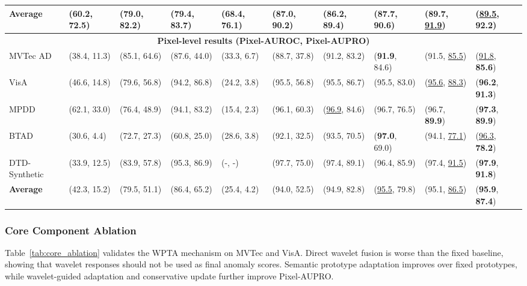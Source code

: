 \documentclass[runningheads]{llncs}
\begin{document}
\begin{table}[htbp]
{\begin{tabular}{llllllllll}
      \midrule
      \textbf{Average} & (60.2, 72.5) & (79.0, 82.2) & (79.4, 83.7) & (68.4, 76.1) & (87.0, 90.2) & (86.2, 89.4) & (87.7, 90.6) & (\textbf{89.7}, \underline{91.9}) & (\underline{89.5}, \textbf{92.2}) \\
      \midrule
      \multicolumn{10}{c}{\textbf{Pixel-level results (Pixel-AUROC, Pixel-AUPRO)}} \\
      \midrule
      MVTec AD & (38.4, 11.3) & (85.1, 64.6) & (87.6, 44.0) & (33.3, 6.7) & (88.7, 37.8) & (91.2, 83.2) & (\textbf{91.9}, 84.6) & (91.5, \underline{85.5}) & (\underline{91.8}, \textbf{85.6}) \\
      VisA & (46.6, 14.8) & (79.6, 56.8) & (94.2, 86.8) & (24.2, 3.8) & (95.5, 56.8) & (95.5, 86.7) & (95.5, 83.0) & (\underline{95.6}, \underline{88.3}) & (\textbf{96.2}, \textbf{91.3}) \\
      MPDD & (62.1, 33.0) & (76.4, 48.9) & (94.1, 83.2) & (15.4, 2.3) & (96.1, 60.3) & (\underline{96.9}, 84.6) & (96.7, 76.5) & (96.7, \textbf{89.9}) & (\textbf{97.3}, \textbf{89.9}) \\
      BTAD & (30.6, 4.4) & (72.7, 27.3) & (60.8, 25.0) & (28.6, 3.8) & (92.1, 32.5) & (93.5, 70.5) & (\textbf{97.0}, 69.0) & (94.1, \underline{77.1}) & (\underline{96.3}, \textbf{78.2}) \\
      DTD-Synthetic & (33.9, 12.5) & (83.9, 57.8) & (95.3, 86.9) & (-, -) & (97.7, 75.0) & (97.4, 89.1) & (96.4, 85.9) & (97.4, \underline{91.5}) & (\textbf{97.9}, \textbf{91.8}) \\
      \midrule
      \textbf{Average} & (42.3, 15.2) & (79.5, 51.1) & (86.4, 65.2) & (25.4, 4.2) & (94.0, 52.5) & (94.9, 82.8) & (\underline{95.5}, 79.8) & (95.1, \underline{86.5}) & (\textbf{95.9}, \textbf{87.4}) \\
      \bottomrule
    \end{tabular}%
  }
\end{table}

\subsubsection{Core Component Ablation}
Table~\ref{tab:core_ablation} validates the WPTA mechanism on MVTec and VisA. Direct wavelet fusion is worse than the fixed baseline, showing that wavelet responses should not be used as final anomaly scores. Semantic prototype adaptation improves over fixed prototypes, while wavelet-guided adaptation and conservative update further improve Pixel-AUPRO.
\end{document}
